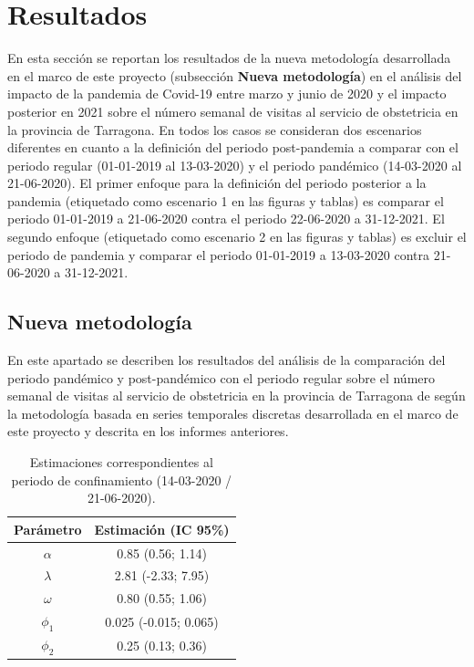 \documentclass[12pt,twoside]{article} %
\begin{document}
\section{Resultados}
En esta sección se reportan los resultados de la nueva metodología desarrollada en el marco de este proyecto (subsección \textbf{Nueva metodología}) en el análisis del impacto de la pandemia de Covid-19 entre marzo y junio de 2020 y el impacto posterior en 2021 sobre el número semanal de visitas al servicio de obstetricia en la provincia de Tarragona. En todos los casos se consideran dos escenarios diferentes en cuanto a la definición del periodo post-pandemia a comparar con el periodo regular (01-01-2019 al 13-03-2020) y el periodo pandémico (14-03-2020 al 21-06-2020). El primer enfoque para la definición del periodo posterior a la pandemia (etiquetado como escenario 1 en las figuras y tablas) es comparar el periodo 01-01-2019 a 21-06-2020 contra el periodo 22-06-2020 a 31-12-2021. El segundo enfoque (etiquetado como escenario 2 en las figuras y tablas) es excluir el periodo de pandemia y comparar el periodo 01-01-2019 a 13-03-2020 contra 21-06-2020 a 31-12-2021.

\subsection{Nueva metodología}
En este apartado se describen los resultados del análisis de la comparación del periodo pandémico y post-pandémico con el periodo regular sobre el número semanal de visitas al servicio de obstetricia en la provincia de Tarragona de según la metodología basada en series temporales discretas desarrollada en el marco de este proyecto y descrita en los informes anteriores.

\begin{table}[H]\caption{Estimaciones correspondientes al periodo de confinamiento (14-03-2020 / 21-06-2020).}
    \centering
    \begin{tabular}{ cc }
        \hline
     \textbf{Parámetro} & \textbf{Estimación (IC 95\%)} \\ 
     \hline
     $\alpha$ & 0.85 (0.56; 1.14) \\
     $\lambda$ & 2.81 (-2.33; 7.95) \\
     $\omega$ & 0.80 (0.55; 1.06) \\
     $\phi_1$ & 0.025 (-0.015; 0.065) \\
     $\phi_2$ & 0.25 (0.13; 0.36) \\
     \hline
    \end{tabular}
  \end{table}
\end{document}
